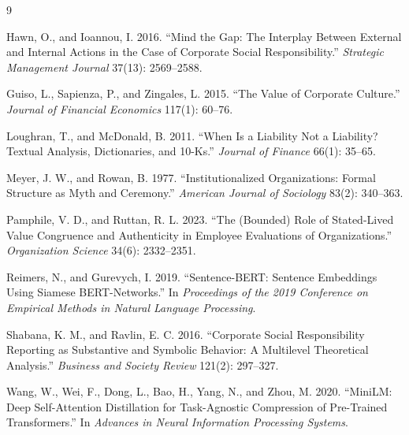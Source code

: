 \documentclass[11pt]{article}
\begin{document}
\begin{thebibliography}{9}

Hawn, O., and Ioannou, I. 2016. ``Mind the Gap: The Interplay Between External and Internal Actions
in the Case of Corporate Social Responsibility.'' \emph{Strategic Management Journal} 37(13):
2569--2588.

Guiso, L., Sapienza, P., and Zingales, L. 2015. ``The Value of Corporate Culture.''
\emph{Journal of Financial Economics} 117(1): 60--76.

Loughran, T., and McDonald, B. 2011. ``When Is a Liability Not a Liability? Textual Analysis,
Dictionaries, and 10-Ks.'' \emph{Journal of Finance} 66(1): 35--65.

Meyer, J. W., and Rowan, B. 1977. ``Institutionalized Organizations: Formal Structure as Myth and
Ceremony.'' \emph{American Journal of Sociology} 83(2): 340--363.

Pamphile, V. D., and Ruttan, R. L. 2023. ``The (Bounded) Role of Stated-Lived Value Congruence and
Authenticity in Employee Evaluations of Organizations.'' \emph{Organization Science} 34(6):
2332--2351.

Reimers, N., and Gurevych, I. 2019. ``Sentence-BERT: Sentence Embeddings Using Siamese BERT-Networks.''
In \emph{Proceedings of the 2019 Conference on Empirical Methods in Natural Language Processing}.

Shabana, K. M., and Ravlin, E. C. 2016. ``Corporate Social Responsibility Reporting as Substantive
and Symbolic Behavior: A Multilevel Theoretical Analysis.'' \emph{Business and Society Review}
121(2): 297--327.

Wang, W., Wei, F., Dong, L., Bao, H., Yang, N., and Zhou, M. 2020. ``MiniLM: Deep Self-Attention
Distillation for Task-Agnostic Compression of Pre-Trained Transformers.'' In \emph{Advances in
Neural Information Processing Systems}.

\end{thebibliography}
\end{document}
